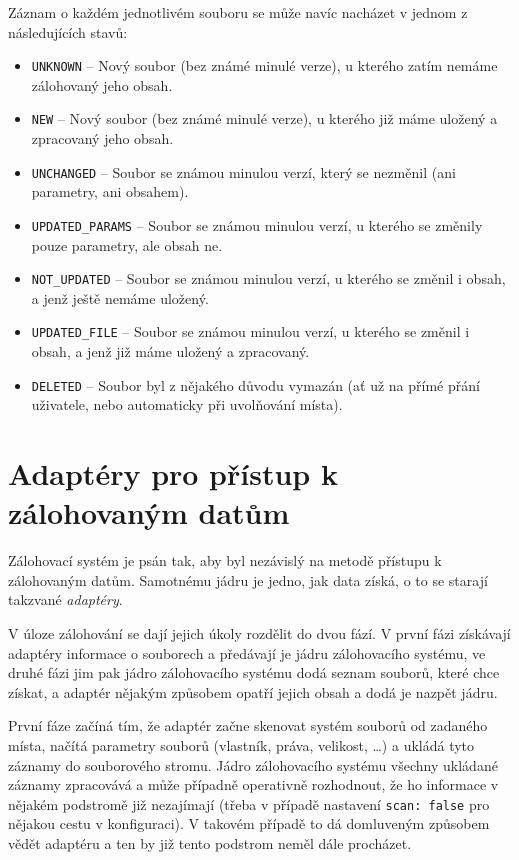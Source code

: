 Záznam o každém jednotlivém souboru se může navíc nacházet v jednom z
následujících stavů:
\begin{itemize}
	\item\texttt{UNKNOWN} -- Nový soubor (bez známé minulé verze), u kterého
	zatím nemáme zálohovaný jeho obsah.
	\item\texttt{NEW} -- Nový soubor (bez známé minulé verze), u kterého již
	máme uložený a zpracovaný jeho obsah.
	\item\texttt{UNCHANGED} -- Soubor se známou minulou verzí, který se
	nezměnil (ani parametry, ani obsahem).
	\item\texttt{UPDATED\_PARAMS} -- Soubor se známou minulou verzí, u kterého
	se změnily pouze parametry, ale obsah ne.
	\item\texttt{NOT\_UPDATED} -- Soubor se známou minulou verzí, u kterého
	se změnil i obsah, a jenž ještě nemáme uložený.
	\item\texttt{UPDATED\_FILE} -- Soubor se známou minulou verzí, u kterého
	se změnil i obsah, a jenž již máme uložený a zpracovaný.
	\item\texttt{DELETED} -- Soubor byl z nějakého důvodu vymazán (ať už na
	přímé přání uživatele, nebo automaticky při uvolňování místa).
\end{itemize}

\section{Adaptéry pro přístup k zálohovaným datům}

Zálohovací systém je psán tak, aby byl nezávislý na metodě přístupu k zálohovaným
datům. Samotnému jádru je jedno, jak data získá, o to se starají takzvané
{\it adaptéry}.

V úloze zálohování se dají jejich úkoly rozdělit do dvou fází. V první fázi
získávají adaptéry informace o souborech a předávají je jádru zálohovacího
systému, ve druhé fázi jim pak jádro zálohovacího systému dodá seznam souborů,
které chce získat, a adaptér nějakým způsobem opatří jejich obsah a dodá je
nazpět jádru.

První fáze začíná tím, že adaptér začne skenovat systém souborů od zadaného
místa, načítá parametry souborů (vlastník, práva, velikost, \dots) a ukládá tyto
záznamy do souborového stromu. Jádro zálohovacího systému všechny ukládané
záznamy zpracovává a může případně operativně rozhodnout, že ho informace v nějakém
podstromě již nezajímají (třeba v případě nastavení \texttt{scan: false} pro
nějakou cestu v konfiguraci). V takovém případě to dá domluveným způsobem vědět
adaptéru a ten by již tento podstrom neměl dále procházet.


